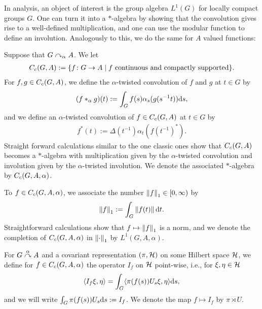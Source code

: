 In analysis, an object of interest is the group algebra $L^1(G)$ for locally compact groups $G$. One can turn it into a $*$-algebra by showing that the convolution gives rise to a well-defined multiplication, and one can use the modular function to define an involution. Analogously to this, we do the same for $A$ valued functions:
\begin{definition}
	Suppose that $G \curvearrowright_\alpha A$. We let 
	\begin{align*}
		C_c(G,A):=\{ f \colon G \to A \mid f \text{ continuous and compactly supported}\}.
	\end{align*}
	For $f,g \in C_c(G,A)$, we define the $\alpha$-twisted convolution of $f$ and $g$ at $t \in G$ by
	\begin{align*}
		(f \ast_\alpha g)(t):= \int_G  f(s) \alpha_s(g(s^{-1}t)) \mathrm{d} s,
	\end{align*}
	and we define an $\alpha$-twisted convolution of $f \in C_c(G,A)$ at $t \in G$ by
	\begin{align*}
		f^*(t):=\Delta(t^{-1}) \alpha_t(f(t^{-1})^*).
	\end{align*}
	Straight forward calculations similar to the one classic ones show that $C_c(G,A)$ becomes a $*$-algebra with multiplication given by the $\alpha$-twisted convolution and involution given by the $\alpha$-twisted involution. We denote the associated $*$-algebra by $C_c(G,A,\alpha)$.
	
	To $f \in C_c(G,A,\alpha)$, we associate the number $\left\lVert f \right\rVert_1 \in [0, \infty)$ by
		\begin{align*}
			\left\lVert f \right\rVert_1 := \int_G \left\lVert f(t) \right\rVert \mathrm{d} t.
		\end{align*}
	Straightforward calculations show that $f \mapsto \left\lVert f \right\rVert_1$ is a norm, and we denote the completion of $C_c(G,A,\alpha)$ in $\left\lVert \cdot \right\rVert_1$ by $L^1(G,A,\alpha)$.
\end{definition}

For $G \stackrel{\alpha}{\curvearrowright} A$ and a covariant representation $(\pi,\mathcal{H})$ on some Hilbert space $\mathcal{H}$, we define for $f \in C_c(G,A,\alpha)$ the operator $I_{f}$ on $\mathcal{H}$ point-wise, i.e., for $\xi, \eta \in \mathcal{H}$
\begin{align*}
	\langle I_f \xi ,\eta \rangle = \int_G \langle \pi(f(s)) U_s \xi, \eta \rangle \mathrm{d} s,
\end{align*}
and we will write $\int_G \pi(f(s)) U_s \mathrm{d} s := I_f$. We denote the map $f \mapsto I_f$ by $\pi \rtimes U$.

